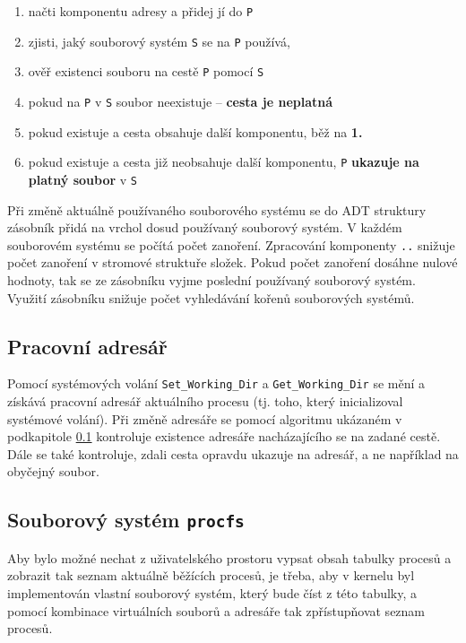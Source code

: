 \documentclass[12pt, a4paper]{article}
\begin{document}
\begin{enumerate}
    \item načti komponentu adresy a přidej jí do \texttt{P}
    \item zjisti, jaký souborový systém \texttt{S} se na \texttt{P} používá, 
    \item ověř existenci souboru na cestě \texttt{P} pomocí \texttt{S}
    \item pokud na \texttt{P} v \texttt{S} soubor neexistuje -- \textbf{cesta je neplatná}
    \item pokud existuje a cesta obsahuje další komponentu, běž na \textbf{1.}
    \item pokud existuje a cesta již neobsahuje další komponentu, \texttt{P} \textbf{ukazuje na platný soubor} v \texttt{S}
\end{enumerate}

Při změně aktuálně používaného souborového systému se do ADT struktury zásobník přidá na vrchol dosud používaný souborový systém. V každém souborovém systému se počítá počet zanoření. Zpracování komponenty \texttt{..} snižuje počet zanoření v stromové struktuře složek. Pokud počet zanoření dosáhne nulové hodnoty, tak se ze zásobníku vyjme poslední používaný souborový systém. Využití zásobníku snižuje počet vyhledávání kořenů souborových systémů. 

\subsection{Pracovní adresář} \label{wd}
Pomocí systémových volání \texttt{Set\_Working\_Dir} a \texttt{Get\_Working\_Dir} se mění a získává pracovní adresář aktuálního procesu (tj. toho, který inicializoval systémové volání). Při změně adresáře se pomocí algoritmu ukázaném v podkapitole \ref{wd} kontroluje existence adresáře nacházajícího se na zadané cestě. Dále se také kontroluje, zdali cesta opravdu ukazuje na adresář, a ne například na obyčejný soubor.

\subsection{Souborový systém \texttt{procfs}}
Aby bylo možné nechat z uživatelského prostoru vypsat obsah tabulky procesů a zobrazit tak seznam aktuálně běžících procesů, je třeba, aby v kernelu byl implementován vlastní souborový systém, který bude číst z této tabulky, a pomocí kombinace virtuálních souborů a adresáře tak zpřístupňovat seznam procesů.
\end{document}
